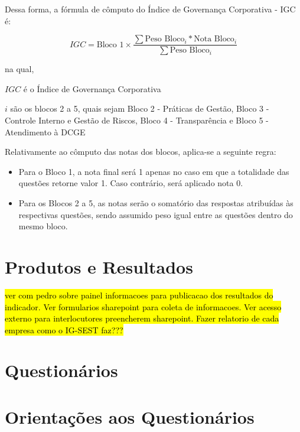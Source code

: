 Dessa forma, a fórmula de cômputo do Índice de Governança Corporativa - IGC é:

\begin{equation}
IGC = \text{Bloco 1} \times \frac{\sum{\text{Peso Bloco}_i * \text{Nota Bloco}_i}}{\sum{\text{Peso Bloco}_i}}
\end{equation}

na qual, 

\({IGC}\) é o Índice de Governança Corporativa

\({i}\) são os blocos 2 a 5, quais sejam Bloco 2 - Práticas de Gestão, Bloco 3 - Controle Interno e Gestão de Riscos, Bloco 4 - Transparência e Bloco 5 - Atendimento à DCGE

Relativamente ao cômputo das notas dos blocos, aplica-se a seguinte regra:

\begin{itemize}

    \item Para o Bloco 1, a nota final será 1 apenas no caso em que a totalidade das questões retorne valor 1. Caso contrário, será aplicado nota 0.
    
    \item Para os Blocos 2 a 5, as notas serão o somatório das respostas atribuídas às respectivas questões, sendo assumido peso igual entre as questões dentro do mesmo bloco.
    
\end{itemize}

\chapter{Produtos e Resultados}
	
\hl{ver com pedro sobre painel informacoes para publicacao dos resultados do indicador. Ver formularios sharepoint para coleta de informacoes. Ver acesso externo para interlocutores preencherem sharepoint. Fazer relatorio de cada empresa como o IG-SEST faz???}

{}


\begin{appendices}
\chapter{Questionários}
\label{chp:quest}



\chapter{Orientações aos Questionários}
\label{chp:comentarios-quest}



\end{appendices}

